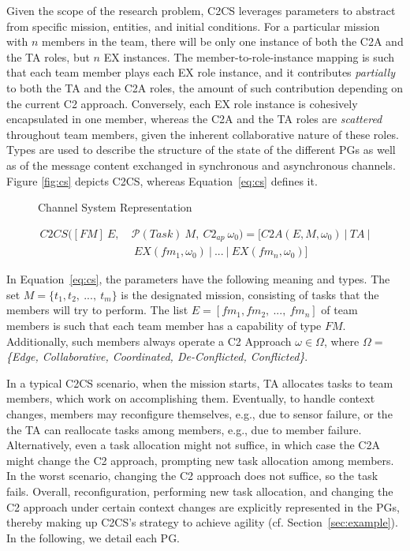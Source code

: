 Given the scope of the research problem, C2CS leverages parameters to abstract from specific mission, entities, and initial conditions. For a particular mission with $n$ members in the team, there will  be only one instance of both the C2A and the TA roles, but $n$ EX instances. The member-to-role-instance mapping is such that each team member plays each EX role instance, and it contributes \textit{partially} to both the TA and the C2A roles, the amount of such contribution depending on the current C2 approach. Conversely, each EX role instance is cohesively encapsulated in one member, whereas the C2A and the TA roles are \textit{scattered} throughout team members, given the inherent collaborative nature of these roles. Types are used to describe the structure of the state of the different PGs as well as of the message content exchanged in synchronous and asynchronous channels.
Figure \ref{fig:cs} depicts C2CS, whereas Equation~\ref{eq:cs} defines it.

\begin{figure}[!ht]
    \centering
    \scalebox{.75}{}
    \caption{Channel System Representation}
    \label{fig:CS}
\end{figure}

\begin{equation}
    \label{eq:cs}
    \begin{split}
    C2CS([FM]\ E,\ &  \mathcal{P}(Task)\ M,\ C2_{ap}\ \omega_0) = [C2A(E, M,\omega_0)\ |\ TA\ | \\ & \ EX(fm_1, \omega_0)\ |\ ...\ |\ EX(fm_n, \omega_0)]
    \end{split}
\end{equation}



In Equation~\ref{eq:cs}, the parameters have the following meaning and types.
The set $M=\{t_1, t_2,\ ...,\ t_m \}$ is the designated mission, consisting of tasks that the members will try to perform. The list $E = [fm_1, fm_2,\ ...,\ fm_n ]$ of team members is such that each team member has a capability of type $FM$. Additionally, such members  always operate a C2 Approach $\omega \in \Omega$,  where $\Omega =$ \textit{\{Edge, Collaborative, Coordinated, De-Conflicted, Conflicted\}}.



In a typical C2CS scenario, when the mission starts, TA allocates tasks to team members, which work on accomplishing them. Eventually, to handle context changes, members may reconfigure themselves, e.g., due to sensor failure, or the the TA can reallocate tasks among members, e.g., due to member failure. Alternatively, even a task allocation might not suffice, in which case the C2A might change the C2 approach, prompting new task allocation among members. In the worst scenario, changing the C2 approach does not suffice, so the task fails. Overall, reconfiguration, performing new task allocation, and changing the C2 approach under certain context changes are explicitly represented in the PGs, thereby making up C2CS's strategy to achieve agility (cf. Section~\ref{sec:example}). In the following, we detail each PG.